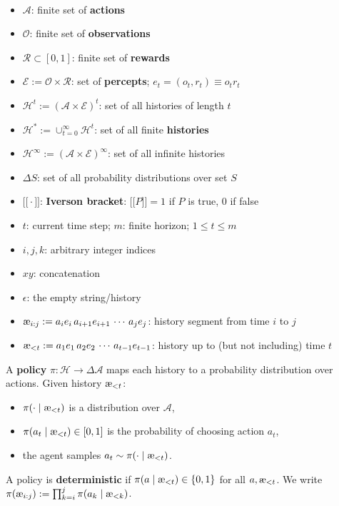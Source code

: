 \documentclass[fontsize=11pt, parskip=half]{scrartcl}
\newcommand{\llbracket}{\mathopen{[\![}}
\newcommand{\rrbracket}{\mathclose{]\!]}}
\newcommand{\cA}{\mathcal{A}}
\newcommand{\cO}{\mathcal{O}}
\newcommand{\cR}{\mathcal{R}}
\newcommand{\cE}{\mathcal{E}}
\newcommand{\cH}{\mathcal{H}}
\newcommand{\aes}{\textnormal{\ae}}
\begin{document}
\begin{definition}\label{def:spaces}\
\begin{itemize}\itemsep=2pt
    \item $\cA$: finite set of \textbf{actions}
    \item $\cO$: finite set of \textbf{observations}
    \item $\cR \subset [0,1]$: finite set of \textbf{rewards}
    \item $\cE := \cO \times \cR$: set of \textbf{percepts}; $e_t = (o_t, r_t) \equiv o_tr_t$
    \item $\cH^t := (\cA \times \cE)^t$: set of all histories of length $t$
    \item $\cH^* := \cup_{t=0}^\infty \cH^t$: set of all finite \textbf{histories}
    \item $\cH^\infty := (\cA \times \cE)^\infty$: set of all infinite histories
    \item $\Delta S$: set of all probability distributions over set $S$
    \item $\llbracket \cdot \rrbracket$: \textbf{Iverson bracket}: $\llbracket P \rrbracket = 1$ if $P$ is true, $0$ if false
    \item $t$: current time step; $m$: finite horizon; $1 \leq t \leq m$
    \item $i, j, k$: arbitrary integer indices
    \item $xy$: concatenation
    \item $\epsilon$: the empty string/history 
    \item $\aes_{i:j} := a_i e_i\, a_{i+1} e_{i+1} \,\cdots\, a_j e_j$: history segment from time $i$ to $j$
    \item $\aes_{<t} := a_1 e_1\, a_2 e_2 \,\cdots\, a_{t-1} e_{t-1}$: history up to (but not including) time $t$
\end{itemize}
\end{definition}

\begin{definition}[Policy $\pi$]\label{def:policy}
A \textbf{policy} $\pi : \cH \to \Delta \cA$ maps each history to a probability distribution over actions. Given history $\aes_{<t}$:
\begin{itemize}\itemsep=2pt
    \item $\pi(\cdot \mid \aes_{<t})$ is a distribution over $\cA$,
    \item $\pi(a_t \mid \aes_{<t}) \in [0,1]$ is the probability of choosing action $a_t$,
    \item the agent samples $a_t \sim \pi(\cdot \mid \aes_{<t})$.
\end{itemize}
A policy is \textbf{deterministic} if $\pi(a \mid \aes_{<t}) \in \{0,1\}$ for all $a, \aes_{<t}$.
We write $\pi(\aes_{i:j}) := \prod_{k=i}^j \pi(a_k \mid \aes_{<k})$.
\end{definition}
\end{document}
